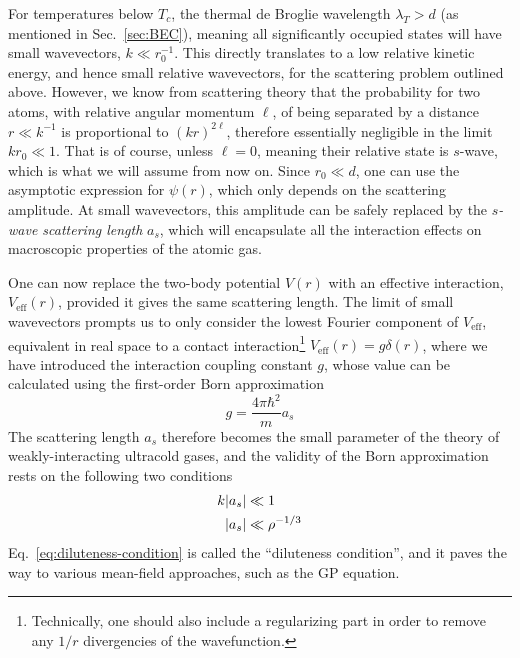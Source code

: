 For temperatures below $T_c$, the thermal de Broglie wavelength
$\lambda_T > d$ (as mentioned in Sec.~\ref{sec:BEC}), meaning all
significantly occupied states will have small wavevectors,
$k \ll r_0^{-1}$. This directly translates to a low relative kinetic
energy, and hence small relative wavevectors, for the scattering
problem outlined above. However, we know from scattering theory that
the probability for two atoms, with relative angular momentum $\ell$,
of being separated by a distance $r \ll k^{-1}$ is proportional to
$(kr)^{2\ell}$, therefore essentially negligible in the limit
$k r_0 \ll 1$. That is of course, unless $\ell = 0$, meaning their
relative state is $s$-wave, which is what we will assume from now
on. Since $r_0 \ll d$, one can use the asymptotic expression for
$\psi(r)$, which only depends on the scattering amplitude. At small
wavevectors, this amplitude can be safely replaced by the
\textit{$s$-wave scattering length} $a_s$, which will encapsulate all
the interaction effects on macroscopic properties of the atomic gas.

One can now replace the two-body potential $V(r)$ with an effective
interaction, $V_{\text{eff}}(r)$, provided it gives the same
scattering length. The limit of small wavevectors prompts us to only
consider the lowest Fourier component of $V_{\text{eff}}$, equivalent
in real space to a contact interaction\footnote{Technically, one
  should also include a regularizing part in order to remove any $1/r$
  divergencies of the wavefunction.}
$V_{\text{eff}}(r) = g \delta(r)$, where we have introduced the
interaction coupling constant $g$, whose value can be calculated using
the first-order Born approximation~\cite{9780198507192} 
%
\begin{equation}\label{eq:g-constant}
  g = \frac{4\pi\hbar^2}{m} a_s
\end{equation}
% 
The scattering length $a_s$ therefore becomes the small parameter of
the theory of weakly-interacting ultracold gases, and the validity of
the Born approximation rests on the following two conditions
%
\begin{align}
  k \vert a_s \vert & \ll 1\\
    \vert a_s \vert & \ll \rho^{-1/3}\label{eq:diluteness-condition}
\end{align}
% 
Eq.~\eqref{eq:diluteness-condition} is called the ``diluteness
condition'', and it paves the way to various mean-field approaches,
such as the GP equation.


